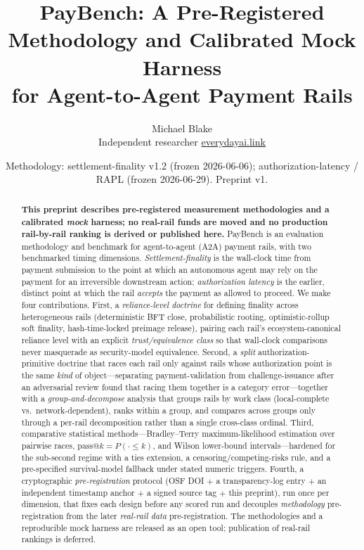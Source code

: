 \documentclass[11pt]{article}
\title{PayBench: A Pre-Registered Methodology and Calibrated Mock Harness\\
for Agent-to-Agent Payment Rails}
\author{Michael Blake\\[2pt]
  \normalsize Independent researcher \;\textbar\; \href{https://everydayai.link}{everydayai.link}}
\date{Methodology: settlement-finality v1.2 (frozen 2026-06-06); authorization-latency / RAPL
(frozen 2026-06-29). Preprint v1.}
\begin{document}
\maketitle

\begin{abstract}
\noindent\textbf{This preprint describes pre-registered measurement methodologies and a calibrated
\emph{mock} harness; no real-rail funds are moved and no production rail-by-rail ranking is derived
or published here.} PayBench is an evaluation methodology and benchmark for agent-to-agent (A2A)
payment rails, with two benchmarked timing dimensions. \emph{Settlement-finality} is the wall-clock
time from payment submission to the point at which an autonomous agent may rely on the payment for an
irreversible downstream action; \emph{authorization latency} is the earlier, distinct point at which
the rail \emph{accepts} the payment as allowed to proceed. We make four contributions. First, a
\emph{reliance-level doctrine} for defining finality across heterogeneous rails (deterministic BFT
close, probabilistic rooting, optimistic-rollup soft finality, hash-time-locked preimage release),
pairing each rail's ecosystem-canonical reliance level with an explicit \emph{trust/equivalence class}
so that wall-clock comparisons never masquerade as security-model equivalence. Second, a \emph{split}
authorization-primitive doctrine that races each rail only against rails whose authorization point is
the same \emph{kind} of object---separating payment-validation from challenge-issuance after an
adversarial review found that racing them together is a category error---together with a
\emph{group-and-decompose} analysis that groups rails by work class (local-complete vs.\
network-dependent), ranks within a group, and compares across groups only through a per-rail
decomposition rather than a single cross-class ordinal. Third, comparative statistical
methods---Bradley--Terry maximum-likelihood estimation over pairwise races, $\mathrm{pass}@k =
P(\cdot \le k)$, and Wilson lower-bound intervals---hardened for the sub-second regime with a ties
extension, a censoring/competing-risks rule, and a pre-specified survival-model fallback under stated
numeric triggers. Fourth, a cryptographic \emph{pre-registration} protocol (OSF DOI $+$ a
transparency-log entry $+$ an independent timestamp anchor $+$ a signed source tag $+$ this preprint),
run once per dimension, that fixes each design before any scored run and decouples \emph{methodology}
pre-registration from the later \emph{real-rail data} pre-registration. The methodologies and a
reproducible mock harness are released as an open tool; publication of real-rail rankings is deferred.
\end{abstract}
\end{document}
